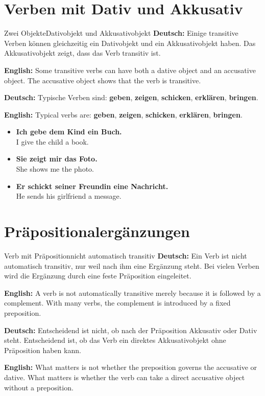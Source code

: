 \documentclass[a4paper,11pt]{article}
\newcommand{\GermanText}[1]{\textbf{Deutsch: }#1\par}
\newcommand{\EnglishText}[1]{{\small\color{SoftGray}\textbf{English: }#1\par}}
\newcommand{\ExampleItem}[2]{\item \textbf{#1}\\{\small\color{SoftGray}#2}}
\begin{document}
    
    \section{Verben mit Dativ und Akkusativ}
        
        \begin{grammarentry}{Zwei Objekte}{Dativobjekt und Akkusativobjekt}
            \GermanText{Einige transitive Verben können gleichzeitig ein Dativobjekt und ein Akkusativobjekt haben. Das Akkusativobjekt zeigt, dass das Verb transitiv ist.}
            \EnglishText{Some transitive verbs can have both a dative object and an accusative object. The accusative object shows that the verb is transitive.}
            
            \GermanText{Typische Verben sind: \textbf{geben}, \textbf{zeigen}, \textbf{schicken}, \textbf{erklären}, \textbf{bringen}.}
            \EnglishText{Typical verbs are: \textbf{geben}, \textbf{zeigen}, \textbf{schicken}, \textbf{erklären}, \textbf{bringen}.}
        \end{grammarentry}
        
        \begin{exbox}
            \begin{itemize}
                \ExampleItem{Ich gebe dem Kind ein Buch.}{I give the child a book.}
                \ExampleItem{Sie zeigt mir das Foto.}{She shows me the photo.}
                \ExampleItem{Er schickt seiner Freundin eine Nachricht.}{He sends his girlfriend a message.}
            \end{itemize}
        \end{exbox}
    
    
    \section{Präpositionalergänzungen}
        
        \begin{grammarentry}{Verb mit Präposition}{nicht automatisch transitiv}
            \GermanText{Ein Verb ist nicht automatisch transitiv, nur weil nach ihm eine Ergänzung steht. Bei vielen Verben wird die Ergänzung durch eine feste Präposition eingeleitet.}
            \EnglishText{A verb is not automatically transitive merely because it is followed by a complement. With many verbs, the complement is introduced by a fixed preposition.}
            
            \GermanText{Entscheidend ist nicht, ob nach der Präposition Akkusativ oder Dativ steht. Entscheidend ist, ob das Verb ein direktes Akkusativobjekt ohne Präposition haben kann.}
            \EnglishText{What matters is not whether the preposition governs the accusative or dative. What matters is whether the verb can take a direct accusative object without a preposition.}
        \end{grammarentry}
        
\end{document}
